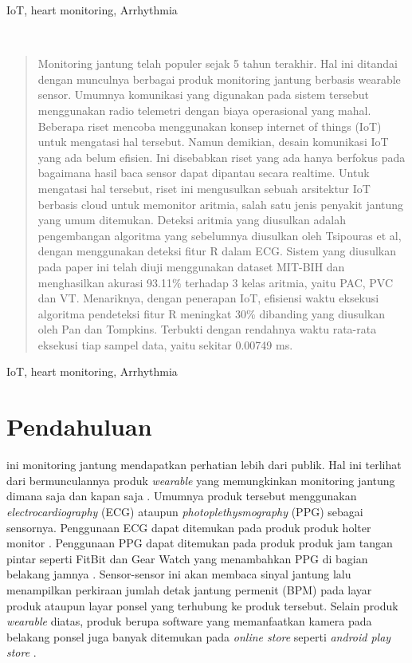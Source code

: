 \documentclass[]{indojc_single}
\begin{document}
\begin{keywords}
IoT, heart monitoring, Arrhythmia
\end{keywords}
$~$\\

\def\abstractname{Abstrak}
\def\keywordsname{Kata Kunci}
\begin{abstract}
Monitoring jantung telah populer sejak 5 tahun terakhir. Hal ini ditandai dengan munculnya berbagai produk monitoring jantung berbasis wearable sensor. Umumnya komunikasi yang digunakan pada sistem tersebut menggunakan radio telemetri dengan biaya operasional yang mahal. Beberapa riset mencoba menggunakan konsep internet of things (IoT) untuk mengatasi hal tersebut. Namun demikian, desain komunikasi IoT yang ada belum efisien. Ini disebabkan riset yang ada hanya berfokus pada bagaimana hasil baca sensor dapat dipantau secara realtime. Untuk mengatasi hal tersebut, riset ini mengusulkan sebuah arsitektur IoT berbasis cloud untuk memonitor aritmia, salah satu jenis penyakit jantung yang umum ditemukan. Deteksi aritmia yang diusulkan adalah pengembangan algoritma yang sebelumnya diusulkan oleh Tsipouras et al, dengan menggunakan deteksi fitur R dalam ECG. Sistem yang diusulkan pada paper ini telah diuji menggunakan dataset MIT-BIH dan menghasilkan akurasi 93.11\% terhadap 3 kelas aritmia, yaitu PAC, PVC dan VT. Menariknya, dengan penerapan IoT, efisiensi waktu eksekusi algoritma pendeteksi fitur R meningkat 30\% dibanding yang diusulkan oleh Pan dan Tompkins. Terbukti dengan rendahnya waktu rata-rata eksekusi tiap sampel data, yaitu sekitar 0.00749 ms.
\end{abstract}

\begin{keywords}
IoT, heart monitoring, Arrhythmia
\end{keywords}

\section{Pendahuluan}
 ini monitoring jantung mendapatkan perhatian lebih dari publik. Hal ini terlihat dari bermunculannya produk \textit{wearable} yang memungkinkan monitoring jantung dimana saja dan kapan saja \cite{online:fitbit, online:samsung_gear, online:endo_holter}. Umumnya produk tersebut menggunakan \textit{electrocardiography} (ECG) ataupun \textit{photoplethysmography} (PPG) sebagai sensornya. Penggunaan ECG dapat ditemukan pada produk produk holter monitor \cite{online:endo_holter}. Penggunaan PPG dapat ditemukan pada produk produk jam tangan pintar seperti FitBit dan Gear Watch yang menambahkan PPG di bagian belakang jamnya \cite{online:fitbit, online:samsung_gear}. Sensor-sensor ini akan membaca sinyal jantung lalu menampilkan perkiraan jumlah detak jantung permenit (BPM) pada layar produk ataupun layar ponsel yang terhubung ke produk tersebut. Selain produk \textit{wearable} diatas, produk berupa software yang memanfaatkan kamera pada belakang ponsel juga banyak ditemukan pada \textit{online store} seperti \textit{android play store} \cite{playstore_heart}.
\end{document}
